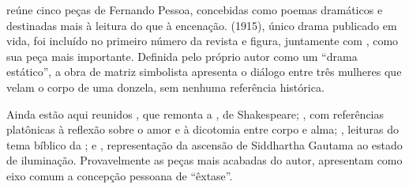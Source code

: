 \hspace*{-7cm}\hrulefill\hspace*{-7cm}

\medskip

 reúne cinco peças de Fernando Pessoa, concebidas 
como poemas dramáticos e destinadas mais à leitura do que à encenação. 
{} (1915), único drama publicado em vida, foi incluído no
primeiro número da revista {} e figura, juntamente com
{}, como sua peça mais importante.  Definida pelo próprio autor
como um ``drama estático'', a obra de matriz simbolista apresenta o diálogo
entre três mulheres que velam o corpo de uma donzela, sem nenhuma referência
histórica.

Ainda estão aqui reunidos {}, que remonta a {}, de Shakespeare; {}, com referências platônicas à reflexão sobre o amor e à dicotomia entre corpo e alma; {}, leituras do
tema bíblico da {}; e {}, representação da ascensão de Siddhartha Gautama ao estado de iluminação. Provavelmente as peças mais acabadas do autor, apresentam como eixo comum a concepção pessoana de ``êxtase''. 
%

\vfill

\hspace*{-.4cm}\begin{minipage}[c]{.5\linewidth}
\small{
{}}
\end{minipage}

\pagebreak


\hspace{.5cm}


